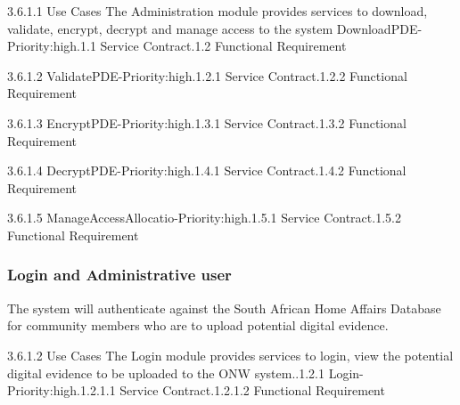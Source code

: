\documentclass[a4paper,12pt]{article}
\begin{document}
3.6.1.1 Use Cases\newline
The Administration module provides services to download, validate, encrypt, decrypt and manage access to the system\newline
DownloadPDE-Priority:high.1.1 Service Contract.1.2 Functional Requirement\newline
	
3.6.1.2 ValidatePDE-Priority:high.1.2.1 Service Contract.1.2.2 Functional Requirement\newline
	
3.6.1.3 EncryptPDE-Priority:high.1.3.1 Service Contract.1.3.2 Functional Requirement\newline
	
3.6.1.4 DecryptPDE-Priority:high.1.4.1 Service Contract.1.4.2 Functional Requirement\newline
	
3.6.1.5 ManageAccessAllocatio-Priority:high.1.5.1 Service Contract.1.5.2 Functional Requirement\newline

\subsubsection {Login and Administrative user}

The system will authenticate against the South African Home Affairs Database for community members who are to upload potential digital evidence.\newline

3.6.1.2 Use Cases\newline
The Login module provides services to login, view the potential digital evidence to be uploaded to the ONW system..1.2.1 Login-Priority:high.1.2.1.1 Service Contract.1.2.1.2 Functional Requirement\newline
	
\end{document}
